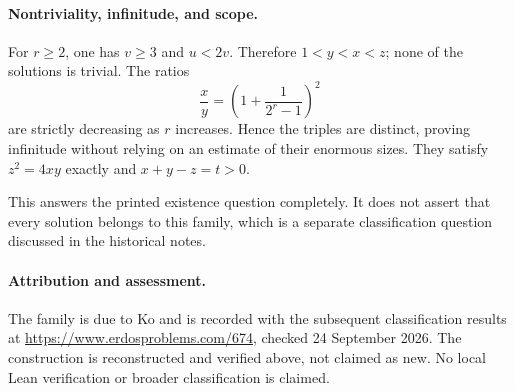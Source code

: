 \paragraph{Nontriviality, infinitude, and scope.}
For \(r\geq2\), one has \(v\geq3\) and \(u<2v\). Therefore \(1<y<x<z\); none of the solutions is trivial. The ratios
\[
 \frac xy=\left(1+\frac1{2^r-1}\right)^2
\]
are strictly decreasing as \(r\) increases. Hence the triples are distinct, proving infinitude without relying on an estimate of their enormous sizes. They satisfy \(z^2=4xy\) exactly and \(x+y-z=t>0\).

This answers the printed existence question completely. It does not assert that every solution belongs to this family, which is a separate classification question discussed in the historical notes.

\paragraph{Attribution and assessment.}
The family is due to Ko and is recorded with the subsequent classification results at \url{https://www.erdosproblems.com/674}, checked 24 September 2026. The construction is reconstructed and verified above, not claimed as new. No local Lean verification or broader classification is claimed.
